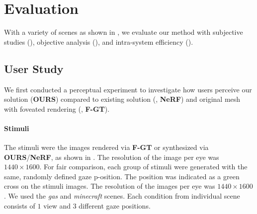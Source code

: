 \section{Evaluation}
\label{sec:result}
With a variety of scenes as shown in , we evaluate our method with subjective studies (), objective analysis (), and intra-system efficiency ().


\subsection{User Study}
\label{sec:study:user}

We first conducted a perceptual experiment to investigate how users perceive our solution ({\bf OURS}) compared to existing solution (\cite{mildenhall2020nerf}, {\bf NeRF}) and original mesh with foveated rendering (\cite{perry2002gaze}, {\bf F-GT}).


\paragraph{Stimuli}

The stimuli were the images rendered via {\bf F-GT} or synthesized via  {\bf OURS}/{\bf NeRF}, as shown in . The resolution of the image per eye was $1440 \times 1600$. 
For fair comparison, each group of stimuli were generated with the same, randomly defined gaze p-osition. The position was indicated as a green cross on the stimuli images.
The resolution of the images per eye was $1440 \times 1600$. 
We used the {\it gas} and {\it minecraft} scenes.
Each condition from individual scene consists of $1$ view and $3$ different gaze positions.

